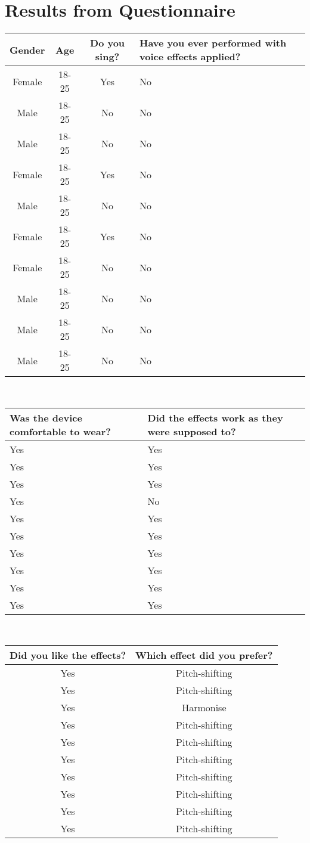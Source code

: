 \section{Results from Questionnaire}\label{AX}

\begin{tabular}{| c | c | c | p{5cm} | }
\hline
Gender & Age & Do you sing? & Have you ever performed with voice effects applied? \\ \hline
Female & 18-25 & Yes & No \\ \hline
Male & 18-25 & No & No \\ \hline
Male & 18-25 & No & No \\ \hline
Female & 18-25 & Yes & No \\ \hline
Male & 18-25 & No & No \\ \hline
Female & 18-25 & Yes & No \\ \hline
Female & 18-25 & No & No \\ \hline
Male & 18-25 & No & No \\ \hline
Male & 18-25 & No & No \\ \hline
Male & 18-25 & No & No \\ \hline
\end{tabular}\\

\begin{tabular}{| p{5cm} |  p{5cm} |}
\hline
Was the device comfortable to wear? & Did the effects work as they were supposed to?  \\ \hline
Yes & Yes   \\ \hline
Yes & Yes  \\ \hline
Yes & Yes\\ \hline
Yes & No  \\ \hline
Yes & Yes \\ \hline
Yes & Yes  \\ \hline
Yes & Yes  \\ \hline
Yes & Yes  \\ \hline
Yes & Yes  \\ \hline
Yes & Yes \\ \hline
\end{tabular}\\

\begin{tabular}{| c |  c |}
\hline
Did you like the effects? & Which effect did you prefer? \\ \hline
Yes & Pitch-shifting \\ \hline
Yes & Pitch-shifting \\ \hline
Yes & Harmonise  \\ \hline
Yes & Pitch-shifting \\ \hline
Yes & Pitch-shifting \\ \hline
Yes & Pitch-shifting \\ \hline
Yes & Pitch-shifting \\ \hline
Yes & Pitch-shifting \\ \hline
Yes & Pitch-shifting \\ \hline
Yes & Pitch-shifting \\ \hline
\end{tabular}\\

